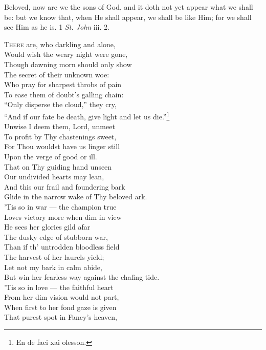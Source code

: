 
Beloved, now are we the sons of God, and it doth not yet appear what we shall be: but we know that, when He shall appear, we shall be like Him; for we shall see Him as he is. 1 \emph{St. John} iii. 2.

\textsc{There} are, who darkling and alone, \\
 Would wish the weary night were gone, \\
 Though dawning morn should only show \\
 The secret of their unknown woe: \\
 Who pray for sharpest throbs of pain \\
 To ease them of doubt’s galling chain: \\
 “Only disperse the cloud,” they cry, \\
 “And if our fate be death, give light and let us die.”\footnote{En de faci xai olesson.} \\
  Unwise I deem them, Lord, unmeet \\
 To profit by Thy chastenings sweet, \\
 For Thou wouldst have us linger still \\
 Upon the verge of good or ill. \\
 That on Thy guiding hand unseen \\
 Our undivided hearts may lean, \\
 And this our frail and foundering bark \\
 Glide in the narrow wake of Thy beloved ark. \\
  ’Tis so in war — the champion true \\
 Loves victory more when dim in view \\
 He sees her glories gild afar \\
 The dusky edge of stubborn war, \\
 Than if th’ untrodden bloodless field \\
 The harvest of her laurels yield; \\
 Let not my bark in calm abide, \\
 But win her fearless way against the chafing tide. \\
  ’Tis so in love — the faithful heart \\
 From her dim vision would not part, \\
 When first to her fond gaze is given \\
 That purest spot in Fancy’s heaven, \\
